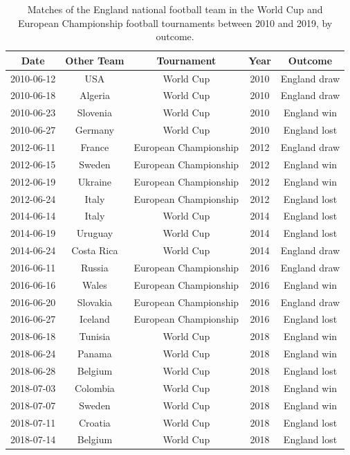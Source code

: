 \documentclass[12pt, a4paper]{article}
\begin{document}
\begin{table}
\centering
    \caption{Matches of the England national football team in the World Cup and European Championship football tournaments between 2010 and 2019, by outcome.}
\begin{tabular}{ccccc}
  \hline
\textbf{Date} & \textbf{Other Team} & \textbf{Tournament} & \textbf{Year} & \textbf{Outcome} \\
  \hline
2010-06-12 & USA & World Cup & 2010 & England draw \\
  2010-06-18 & Algeria & World Cup & 2010 & England draw \\
  2010-06-23 & Slovenia & World Cup & 2010 & England win \\
  2010-06-27 & Germany & World Cup & 2010 & England lost \\
  2012-06-11 & France & European Championship & 2012 & England draw \\
  2012-06-15 & Sweden & European Championship & 2012 & England win \\
  2012-06-19 & Ukraine & European Championship & 2012 & England win \\
  2012-06-24 & Italy & European Championship & 2012 & England lost \\
  2014-06-14 & Italy & World Cup & 2014 & England lost \\
  2014-06-19 & Uruguay & World Cup & 2014 & England lost \\
  2014-06-24 & Costa Rica & World Cup & 2014 & England draw \\
  2016-06-11 & Russia & European Championship & 2016 & England draw \\
  2016-06-16 & Wales & European Championship & 2016 & England win \\
  2016-06-20 & Slovakia & European Championship & 2016 & England draw \\
  2016-06-27 & Iceland & European Championship & 2016 & England lost \\
  2018-06-18 & Tunisia & World Cup & 2018 & England win \\
  2018-06-24 & Panama & World Cup & 2018 & England win \\
  2018-06-28 & Belgium & World Cup & 2018 & England lost \\
  2018-07-03 & Colombia & World Cup & 2018 & England win \\
  2018-07-07 & Sweden & World Cup & 2018 & England win \\
  2018-07-11 & Croatia & World Cup & 2018 & England lost \\
  2018-07-14 & Belgium & World Cup & 2018 & England lost \\
   \hline
\end{tabular}
  \label{Tab:matches}
\end{table}
\end{document}
